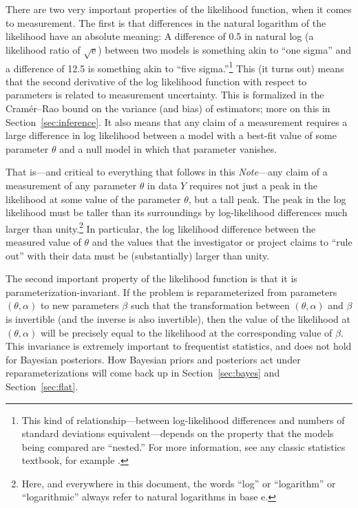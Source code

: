 \documentclass{article}
\newcommand{\documentname}{\textsl{Note}}
\newcommand{\sectionname}{Section}
\newcommand{\secref}[1]{\sectionname~\ref{#1}}
\newcommand{\e}{\mathrm{e}} %
\begin{document}
There are two very important properties of the likelihood function, when it comes to measurement.
The first is that differences in the natural logarithm of the likelihood have an absolute meaning:
A difference of 0.5 in natural log (a likelihood ratio of $\sqrt{\e}$) between two models is something akin to ``one sigma'' and a difference of 12.5 is something akin to ``five sigma.''\footnote{%
This kind of relationship---between log-likelihood differences and numbers of standard deviations equivalent---depends on the property that the models being compared are ``nested.''
For more information, see any classic statistics textbook, for example \cite{casellaberger}.}
This (it turns out) means that the second derivative of the log likelihood function with respect to parameters is related to measurement uncertainty.
This is formalized in the Cram\'er--Rao bound \cite{cramer, rao} on the variance (and bias) of estimators; more on this in \secref{sec:inference}.
It also means that any claim of a measurement requires a large difference in log likelihood between a model with a best-fit value of some parameter $\theta$ and a null model in which that parameter vanishes.

That is---and critical to everything that follows in this \documentname---any claim of a measurement of any parameter $\theta$ in data $Y$ requires not just a peak in the likelihood at some value of the parameter $\theta$, but a tall peak.
The peak in the log likelihood must be taller than its surroundings by log-likelihood differences much larger than unity.\footnote{Here, and everywhere in this document, the words ``log'' or ``logarithm'' or ``logarithmic'' always refer to natural logarithms in base $\e$.}
In particular, the log likelihood difference between the measured value of $\theta$ and the values that the investigator or project claims to ``rule out'' with their data must be (substantially) larger than unity.

The second important property of the likelihood function is that it is par\-am\-e\-ter\-i\-za\-tion-invariant.
If the problem is reparameterized from parameters $(\theta,\alpha)$ to new parameters $\beta$ such that the transformation between $(\theta,\alpha)$ and $\beta$ is invertible (and the inverse is also invertible), then the value of the likelihood at $(\theta,\alpha)$ will be precisely equal to the likelihood at the corresponding value of $\beta$.
This invariance is extremely important to frequentist statistics, and does not hold for Bayesian posteriors.
How Bayesian priors and posteriors act under reparameterizations will come back up in \secref{sec:bayes} and \secref{sec:flat}.
\end{document}
